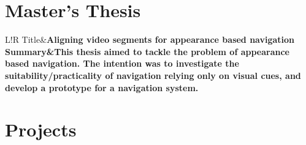 \documentclass[11pt]{article}
\newcommand\VRule{\color{lightgray}\vrule width 0.10pt}
\begin{document}
\section*{Master's Thesis}
\begin{tabular}{L!{\VRule}R}
    Title&\bf{Aligning video segments for appearance based navigation}\\
	Summary&This thesis aimed to tackle the problem of appearance based navigation. The intention was to investigate the suitability/practicality of navigation relying only on visual cues, and develop a prototype for a navigation system.\\[10pt]
\end{tabular}

\section*{Projects}
\end{document}
